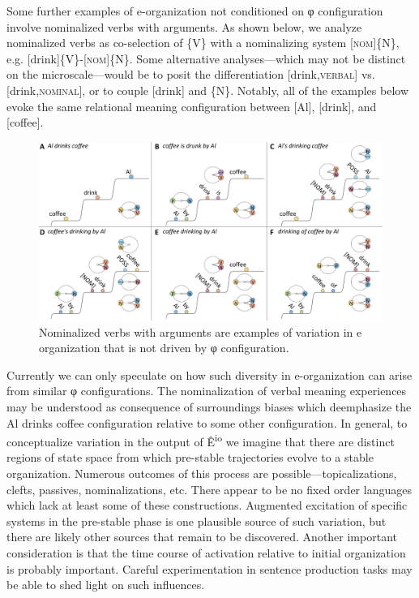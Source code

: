   Some further examples of e-organization not conditioned on φ configuration involve nominalized verbs with arguments. As shown below, we analyze nominalized verbs as co-selection of \{V\} with a nominalizing system [\textsc{nom}]\{N\}, e.g. [drink]\{V\}-[\textsc{nom}]\{\textsc{N}\}. Some alternative analyses—which may not be distinct on the microscale—would be to posit the differentiation [drink,\textsc{verbal}] vs. [drink,\textsc{nominal}], or to couple [drink] and \{N\}. Notably, all of the examples below evoke the same relational meaning configuration between [Al], [drink], and [coffee].

  
\begin{figure}
\includegraphics[width=\textwidth]{figures/Tilsen-img82.png}
\caption{Nominalized verbs with arguments are examples of variation in e organization that is not driven by φ configuration.}
\label{fig:4:32}
\end{figure}
 

  Currently we can only speculate on how such diversity in e-organization can arise from similar φ configurations. The nominalization of verbal meaning experiences may be understood as consequence of surroundings biases which deemphasize the {\textbar}Al drinks coffee{\textbar} configuration relative to some other configuration. In general, to conceptualize variation in the output of Ê\textsuperscript{io} we imagine that there are distinct regions of state space from which pre-stable trajectories evolve to a stable organization. Numerous outcomes of this process are possible—topicalizations, clefts, passives, nominalizations, etc. There appear to be no fixed order languages which lack at least some of these constructions. Augmented excitation of specific systems in the pre-stable phase is one plausible source of such variation, but there are likely other sources that remain to be discovered. Another important consideration is that the time course of activation relative to initial organization is probably important. Careful experimentation in sentence production tasks may be able to shed light on such influences.

